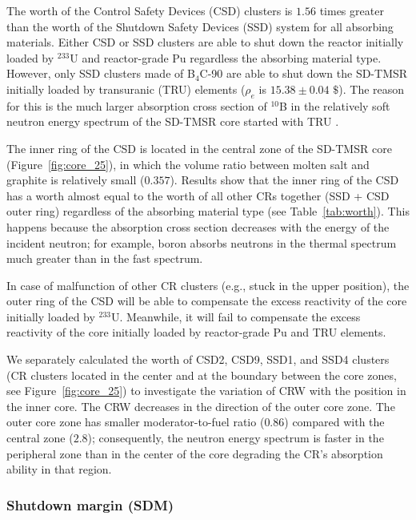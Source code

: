 The worth of the Control Safety Devices (CSD) clusters is $1.56$ times greater than 
the worth of the Shutdown Safety Devices (SSD) system for all absorbing materials. Either CSD or SSD 
clusters are able to shut down the reactor initially loaded by 
$^{233}$U and reactor-grade Pu regardless the absorbing material type.
However, only SSD clusters made of B$_4$C-90 are able to shut down the SD-TMSR 
initially loaded by transuranic (TRU) elements ($\rho_e$ is $15.38\pm0.04$ $\$$).
The reason for this is the much larger 
absorption cross section of $^{10}$B in the relatively soft neutron energy 
spectrum of the SD-TMSR core started with TRU \cite{ashraf2020Strategies}.

The inner ring of the CSD is located in the central zone of the SD-TMSR core 
(Figure~\ref{fig:core_25}), in which the volume ratio between molten salt and 
graphite is relatively small ($0.357$). Results show that the inner ring of the CSD has 
a worth almost equal to the worth of all other CRs together (SSD + CSD outer ring) regardless of 
the absorbing material type (see Table~\ref{tab:worth}). This happens because the absorption cross section
decreases with the energy of the incident neutron; for example, boron absorbs neutrons in the thermal spectrum much 
greater than in the fast spectrum.

In case of malfunction of other CR clusters (e.g., stuck in the upper 
position), the outer ring of the CSD will be able to compensate the excess reactivity of the core initially loaded by $^{233}$U.
Meanwhile, it will fail to compensate the excess 
reactivity of the core initially loaded by reactor-grade Pu and TRU elements.

We separately calculated the worth of CSD2, CSD9, SSD1, and SSD4 clusters (CR clusters located in the center and at the boundary between the core
zones, see Figure~\ref{fig:core_25}) to investigate the variation of CRW with the position in the inner core.
The CRW decreases in the direction of the outer core zone. The outer core zone 
has smaller moderator-to-fuel ratio ($0.86$) compared with the central zone 
($2.8$); consequently, the neutron energy spectrum is faster in the peripheral 
zone than in the center of the core degrading the CR's 
absorption ability in that region.

\subsubsection{Shutdown margin (SDM)}

